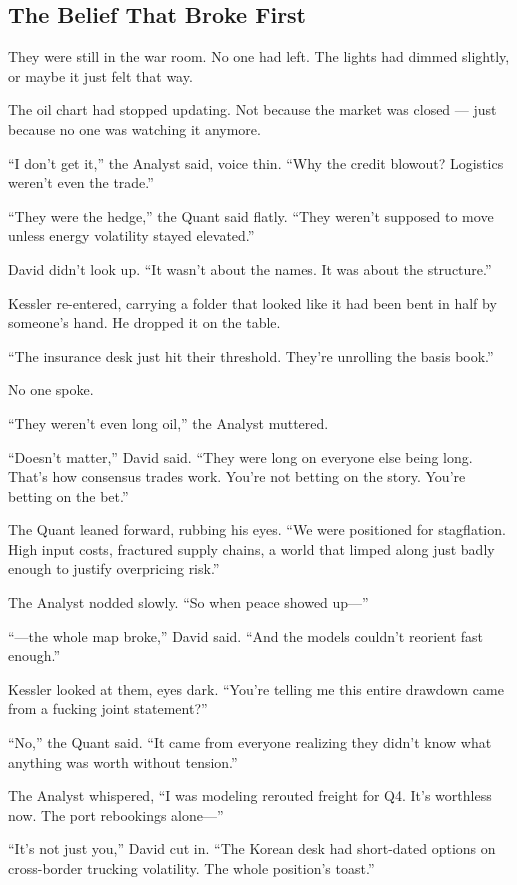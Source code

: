
\subsection{The Belief That Broke First}

They were still in the war room. No one had left. The lights had dimmed slightly, or maybe it just felt that way.

The oil chart had stopped updating. Not because the market was closed — just because no one was watching it anymore.

“I don’t get it,” the Analyst said, voice thin. “Why the credit blowout? Logistics weren’t even the trade.”

“They were the hedge,” the Quant said flatly. “They weren’t supposed to move unless energy volatility stayed elevated.”

David didn’t look up. “It wasn’t about the names. It was about the structure.”

Kessler re-entered, carrying a folder that looked like it had been bent in half by someone’s hand. He dropped it on the table.

“The insurance desk just hit their threshold. They’re unrolling the basis book.”

No one spoke.

“They weren’t even long oil,” the Analyst muttered.

“Doesn’t matter,” David said. “They were long on everyone else being long. That’s how consensus trades work. You’re not betting on the story. You’re betting on the bet.”

The Quant leaned forward, rubbing his eyes. “We were positioned for stagflation. High input costs, fractured supply chains, a world that limped along just badly enough to justify overpricing risk.”

The Analyst nodded slowly. “So when peace showed up—”

“—the whole map broke,” David said. “And the models couldn’t reorient fast enough.”

Kessler looked at them, eyes dark. “You’re telling me this entire drawdown came from a fucking joint statement?”

“No,” the Quant said. “It came from everyone realizing they didn’t know what anything was worth without tension.”

The Analyst whispered, “I was modeling rerouted freight for Q4. It’s worthless now. The port rebookings alone—”

“It’s not just you,” David cut in. “The Korean desk had short-dated options on cross-border trucking volatility. The whole position’s toast.”

